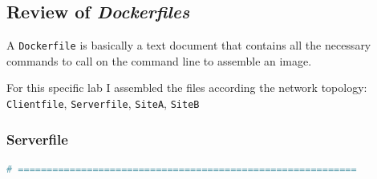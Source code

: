


\subsection{Review of \textit{Dockerfiles}\cite{docker.dockerfiles}}
\label{apx:lab-final_dockerfiles}

A \lstinline{Dockerfile} is basically a text document that contains all the necessary
commands to call on the command line to assemble an image.


For this specific lab I assembled the files according the network topology:
\lstinline{Clientfile}, \lstinline{Serverfile},
\lstinline{SiteA}, \lstinline{SiteB}


\subsubsection{Serverfile}
\label{apx:dockerfile.serverfile}

\begin{lstlisting}[language=bash,caption=Serverile overview for container vpn-server-10.9.0.11]
    # ===========================================================
    \end{lstlisting}